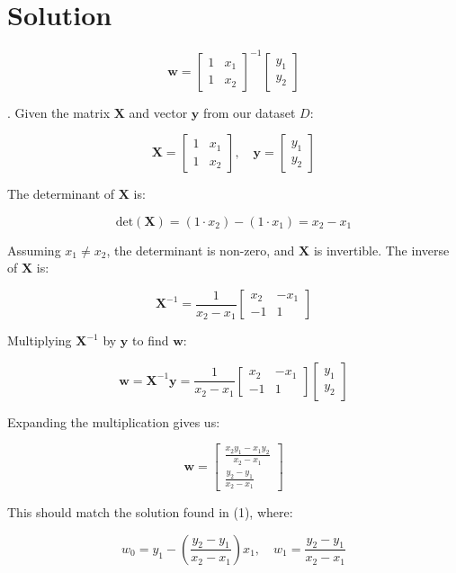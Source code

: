 \documentclass{harvardml}
\theoremstyle{definition}
\theoremstyle{plain}
\newenvironment{solution}
  {\color{blue}\section*{Solution}}
{}
\begin{document}
\begin{solution}
\[
\mathbf{w} = \begin{bmatrix} 1 & x_1 \\ 1 & x_2 \end{bmatrix}^{-1} \begin{bmatrix} y_1 \\ y_2 \end{bmatrix}
\]

. Given the matrix $\mathbf{X}$ and vector $\mathbf{y}$ from our dataset $D$:

\[
\mathbf{X} = \begin{bmatrix} 1 & x_1 \\ 1 & x_2 \end{bmatrix}, \quad \mathbf{y} = \begin{bmatrix} y_1 \\ y_2 \end{bmatrix}
\]

The determinant of $\mathbf{X}$ is:

\[
\text{det}(\mathbf{X}) = (1 \cdot x_2) - (1 \cdot x_1) = x_2 - x_1
\]

Assuming $x_1 \neq x_2$, the determinant is non-zero, and $\mathbf{X}$ is invertible. The inverse of $\mathbf{X}$ is:

\[
\mathbf{X}^{-1} = \frac{1}{x_2 - x_1}\begin{bmatrix} x_2 & -x_1 \\ -1 & 1 \end{bmatrix}
\]

Multiplying $\mathbf{X}^{-1}$ by $\mathbf{y}$ to find $\mathbf{w}$:

\[
\mathbf{w} = \mathbf{X}^{-1}\mathbf{y} = \frac{1}{x_2 - x_1}\begin{bmatrix} x_2 & -x_1 \\ -1 & 1 \end{bmatrix} \begin{bmatrix} y_1 \\ y_2 \end{bmatrix}
\]

Expanding the multiplication gives us:

\[
\mathbf{w} = \begin{bmatrix} \frac{x_2y_1 - x_1y_2}{x_2 - x_1} \\ \frac{y_2 - y_1}{x_2 - x_1} \end{bmatrix}
\]

This should match the solution found in (1), where:

\[
w_0 = y_1 - \left(\frac{y_2 - y_1}{x_2 - x_1}\right)x_1, \quad w_1 = \frac{y_2 - y_1}{x_2 - x_1}
\]


\end{solution}
\end{document}
